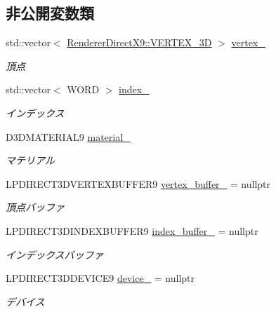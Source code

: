 \subsection*{非公開変数類}
\begin{DoxyCompactItemize}
\item 
std\+::vector$<$ \mbox{\hyperlink{class_renderer_direct_x9_1_1_v_e_r_t_e_x__3_d}{Renderer\+Direct\+X9\+::\+V\+E\+R\+T\+E\+X\+\_\+3D}} $>$ \mbox{\hyperlink{class_plane_polygon_a81a3f3d50f00a8772bc47c1015789e7a}{vertex\+\_\+}}
\begin{DoxyCompactList}\small\item\em 頂点 \end{DoxyCompactList}\item 
std\+::vector$<$ W\+O\+RD $>$ \mbox{\hyperlink{class_plane_polygon_a75b4c7fca8f0b25f11bd59da087b5a07}{index\+\_\+}}
\begin{DoxyCompactList}\small\item\em インデックス \end{DoxyCompactList}\item 
D3\+D\+M\+A\+T\+E\+R\+I\+A\+L9 \mbox{\hyperlink{class_plane_polygon_a1427bc1b198247eb0a82485f6d63c23e}{material\+\_\+}}
\begin{DoxyCompactList}\small\item\em マテリアル \end{DoxyCompactList}\item 
L\+P\+D\+I\+R\+E\+C\+T3\+D\+V\+E\+R\+T\+E\+X\+B\+U\+F\+F\+E\+R9 \mbox{\hyperlink{class_plane_polygon_a04d132486ffae704f7200718ae395170}{vertex\+\_\+buffer\+\_\+}} = nullptr
\begin{DoxyCompactList}\small\item\em 頂点バッファ \end{DoxyCompactList}\item 
L\+P\+D\+I\+R\+E\+C\+T3\+D\+I\+N\+D\+E\+X\+B\+U\+F\+F\+E\+R9 \mbox{\hyperlink{class_plane_polygon_adc95fd0cfa590e34aba0f7928539a0ff}{index\+\_\+buffer\+\_\+}} = nullptr
\begin{DoxyCompactList}\small\item\em インデックスバッファ \end{DoxyCompactList}\item 
L\+P\+D\+I\+R\+E\+C\+T3\+D\+D\+E\+V\+I\+C\+E9 \mbox{\hyperlink{class_plane_polygon_a9b07736e5b36983967d0fac67c39dc82}{device\+\_\+}} = nullptr
\begin{DoxyCompactList}\small\item\em デバイス \end{DoxyCompactList}\end{DoxyCompactItemize}

